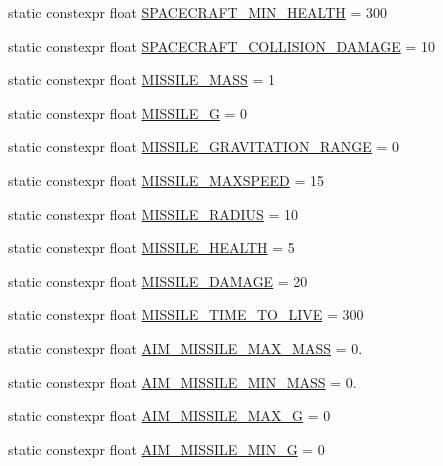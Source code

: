 \begin{DoxyCompactItemize}
\item 
static constexpr float \hyperlink{class_act_conf_a4297e9d1af0a2ee362d5c2d013373042}{S\+P\+A\+C\+E\+C\+R\+A\+F\+T\+\_\+\+M\+I\+N\+\_\+\+H\+E\+A\+L\+T\+H} = 300
\item 
static constexpr float \hyperlink{class_act_conf_a3a85e4db474dcb1a3703edc1c895f0df}{S\+P\+A\+C\+E\+C\+R\+A\+F\+T\+\_\+\+C\+O\+L\+L\+I\+S\+I\+O\+N\+\_\+\+D\+A\+M\+A\+G\+E} = 10
\item 
static constexpr float \hyperlink{class_act_conf_aaebc1ea66f7ff7aa8bbdb0c313140264}{M\+I\+S\+S\+I\+L\+E\+\_\+\+M\+A\+S\+S} = 1
\item 
static constexpr float \hyperlink{class_act_conf_a1f233fc91477f2d8bc52db32e9a111d2}{M\+I\+S\+S\+I\+L\+E\+\_\+\+G} = 0
\item 
static constexpr float \hyperlink{class_act_conf_ae2fe14794e28bae3571de8ce1bf901fd}{M\+I\+S\+S\+I\+L\+E\+\_\+\+G\+R\+A\+V\+I\+T\+A\+T\+I\+O\+N\+\_\+\+R\+A\+N\+G\+E} = 0
\item 
static constexpr float \hyperlink{class_act_conf_a30479e68a256f90f89ec6b20b0d5c6b5}{M\+I\+S\+S\+I\+L\+E\+\_\+\+M\+A\+X\+S\+P\+E\+E\+D} = 15
\item 
static constexpr float \hyperlink{class_act_conf_abda43f7dc1cae04d874aa5b86ec3498e}{M\+I\+S\+S\+I\+L\+E\+\_\+\+R\+A\+D\+I\+U\+S} = 10
\item 
static constexpr float \hyperlink{class_act_conf_ae9c587ef6ebfcbcf822d31f999752f76}{M\+I\+S\+S\+I\+L\+E\+\_\+\+H\+E\+A\+L\+T\+H} = 5
\item 
static constexpr float \hyperlink{class_act_conf_a900ebd46115481058e6d19e330566889}{M\+I\+S\+S\+I\+L\+E\+\_\+\+D\+A\+M\+A\+G\+E} = 20
\item 
static constexpr float \hyperlink{class_act_conf_a4f96844a15618628e1757a2c9d860c59}{M\+I\+S\+S\+I\+L\+E\+\_\+\+T\+I\+M\+E\+\_\+\+T\+O\+\_\+\+L\+I\+V\+E} = 300
\item 
static constexpr float \hyperlink{class_act_conf_aa684b4626b1f4fcd220ed04d3c6ce0b0}{A\+I\+M\+\_\+\+M\+I\+S\+S\+I\+L\+E\+\_\+\+M\+A\+X\+\_\+\+M\+A\+S\+S} = 0.
\item 
static constexpr float \hyperlink{class_act_conf_ae896de277b11c901951c0353e5ad8a56}{A\+I\+M\+\_\+\+M\+I\+S\+S\+I\+L\+E\+\_\+\+M\+I\+N\+\_\+\+M\+A\+S\+S} = 0.
\item 
static constexpr float \hyperlink{class_act_conf_a5fc2b902e93d5fa994576d61c1da7d4b}{A\+I\+M\+\_\+\+M\+I\+S\+S\+I\+L\+E\+\_\+\+M\+A\+X\+\_\+\+G} = 0
\item 
static constexpr float \hyperlink{class_act_conf_a14cc53d07a2b882af1e85615a268ce9a}{A\+I\+M\+\_\+\+M\+I\+S\+S\+I\+L\+E\+\_\+\+M\+I\+N\+\_\+\+G} = 0

\end{DoxyCompactItemize}
